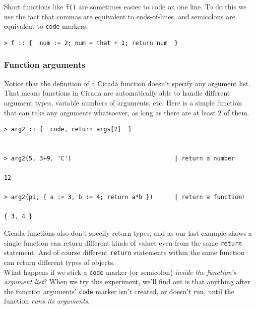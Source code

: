 \documentclass{article}
\newenvironment{code}{
       \begin{list}{}{
               \setlength{\leftmargin}{.4in}
               \setlength{\rightmargin}{0in}
               \setlength{\topsep}{.2in}
       }
       \small
       \item[] }
       { \end{list}   }
\begin{document}
Short functions like \verb#f()# are sometimes easier to code on one line.  To do this we use the fact that commas are equivalent to ends-of-lines, and semicolons are equivalent to \verb#code# markers.

\begin{code} \begin{verbatim}
> f :: {  num := 2; num = that + 1; return num  }
\end{verbatim} \end{code}








\subsubsection{Function arguments} 

Notice that the definition of a Cicada function doesn't specify any argument list.  That means functions in Cicada are automatically able to handle different argument types, variable numbers of arguments, etc.  Here is a simple function that can take any arguments whatsoever, as long as there are at least 2 of them.

\begin{code} \begin{verbatim}
> arg2 :: {  code, return args[2]  }


> arg2(5, 3+9, 'C')                             | return a number

12

> arg2(pi, { a := 3, b := 4; return a*b })      | return a function! 

{ 3, 4 }
\end{verbatim} \end{code}

\noindent Cicada functions also don't specify return types, and as our last example shows a single function can return different kinds of values even from the same \verb#return# statement.  And of course different \verb#return# statements within the same function can return different types of objects.\\

What happens if we stick a \texttt{code} marker (or semicolon) \emph{inside the function's argument list}?  When we try this experiment, we'll find out is that anything after the function arguments' \verb#code# marker isn't created, or doesn't run, until the function \emph{runs its arguments}.
\end{document}

